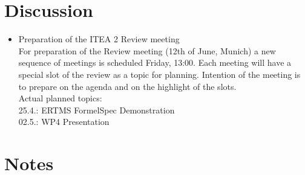\documentclass[a4paper, 11pt]{article}
\begin{document}
\section{Discussion}
\begin{itemize}
\item Preparation of the ITEA 2 Review meeting\\
For preparation of the Review meeting (12th of June, Munich) a new sequence of meetings is scheduled Friday, 13:00. Each meeting will have a special slot of the review as a topic for planning. Intention of the meeting is to prepare on the agenda and on the highlight of the slots.\\
Actual planned topics:\\
25.4.: ERTMS FormelSpec Demonstration\\
02.5.: WP4 Presentation\\

\end{itemize}

\section{Notes}
\end{document}
